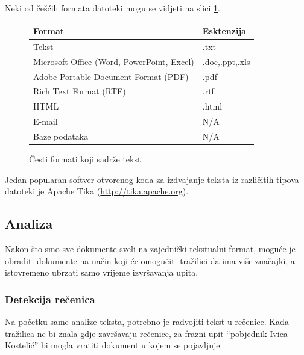 \documentclass[a4paper,twoside,12pt]{scrreprt}
\begin{document}
Neki od češćih formata datoteki mogu se vidjeti na slici \ref{formats}.

{\renewcommand{\arraystretch}{1.2}
\begin{figure}[H]
  \centering
  \begin{tabular}{|l|l|}
    \hline
    \textbf{Format}                            & \textbf{Esktenzija} \\
    \hline
    Tekst                                      & .txt                \\
    \hline
    Microsoft Office (Word, PowerPoint, Excel) & .doc,.ppt,.xls      \\
    \hline
    Adobe Portable Document Format (PDF)       & .pdf                \\
    \hline
    Rich Text Format (RTF)                     & .rtf                \\
    \hline
    HTML                                       & .html               \\
    \hline
    E-mail                                     & N/A                 \\
    \hline
    Baze podataka                              & N/A                 \\
    \hline
  \end{tabular}
  \caption{Česti formati koji sadrže tekst}
  \label{formats}
\end{figure}
}

Jedan popularan softver otvorenog koda za izdvajanje teksta iz različitih tipova datoteki je Apache Tika (\url{http://tika.apache.org}).

\subsection{Analiza}

Nakon što smo sve dokumente sveli na zajednički tekstualni format, moguće je obraditi dokumente na način koji će omogućiti tražilici da ima više značajki, a istovremeno ubrzati samo vrijeme izvršavanja upita.

\subsubsection{Detekcija rečenica}

Na početku same analize teksta, potrebno je radvojiti tekst u rečenice. Kada tražilica ne bi znala gdje završavaju rečenice, za frazni upit ``pobjednik Ivica Kostelić'' bi mogla vratiti dokument u kojem se pojavljuje:
\end{document}
